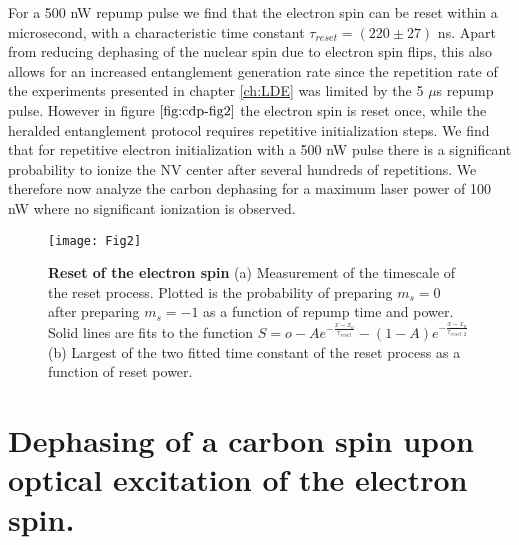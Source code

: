 For a 500 nW repump pulse we find that the electron spin can be reset within a microsecond, with a characteristic time constant $\tau_{reset} = (220 \pm 27) $ ns. Apart from reducing dephasing of the nuclear spin due to electron spin flips, this also allows for an increased entanglement generation rate since the repetition rate of the experiments presented in chapter \ref{ch:LDE} was limited by the 5 $\mu$s repump pulse. However in figure $\ref{fig:cdp-fig2}$ the electron spin is reset once, while the heralded entanglement protocol requires repetitive initialization steps. We find that for repetitive electron initialization with a 500 nW pulse there is a significant probability to ionize the NV center after several hundreds of repetitions. We therefore now analyze the carbon dephasing for a maximum laser power of 100 nW where no significant ionization is observed.

 \begin{figure*}
	\centering
	\texttt{[image: Fig2]}
	\caption{\label{fig:cdp-fig2} \textbf{Reset of the electron spin} (a) Measurement of the timescale of the reset process. Plotted is the probability of preparing $m_s = 0$ after preparing $m_s = -1$ as a function of repump time and power. Solid lines are fits to the function $S = o - A e^{-\frac{x-x_o}{\tau_{reset}}}-(1-A) e^{-\frac{x-x_o}{\tau_{reset,2}}}$ (b) Largest of the two fitted time constant of the reset process as a function of reset power.}
\end{figure*}

\section{Dephasing of a carbon spin upon optical excitation of the electron spin.}

